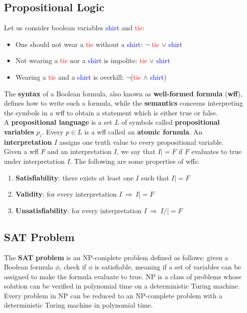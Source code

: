 \documentclass{article}
\begin{document}
\subsection{Propositional Logic}
Let us consider boolean variables \textcolor{blue}{shirt} and \textcolor{red}{tie}:
\begin{itemize}
    \item One should not wear a \textcolor{red}{tie} without a \textcolor{blue}{shirt}: $\neg$ \textcolor{red}{tie} $\lor$ \textcolor{blue}{shirt}
    \item Not wearing a \textcolor{red}{tie} nor a \textcolor{blue}{shirt} is impolite: \textcolor{red}{tie} $\lor$ \textcolor{blue}{shirt}
    \item Wearing a \textcolor{red}{tie} and a \textcolor{blue}{shirt} is overkill: $\neg$(\textcolor{red}{tie} $\land$ \textcolor{blue}{shirt})
\end{itemize}
The \textbf{syntax} of a Boolean formula, also known as \textbf{well-formed formula} (\textbf{wff}), defines how to write such a formula, while the \textbf{semantics} concerns interpreting the symbols in a wff to obtain a statement which is either true or false. \\
A \textbf{propositional language} is a set $L$ of symbols called \textbf{propositional variables} $p_i$. Every $p \in L$ is a wff called an \textbf{atomic formula}. An \textbf{interpretation} $I$ assigns one truth value to every propositional variable. \\
Given a wff $F$ and an interpretation $I$, we say that $I |= F$ if $F$ evaluates to true under interpretation $I$.
The following are some properties of wffs:
\begin{enumerate}
    \item \textbf{Satisfiability}: there exists at least one $I$ such that $I |= F$
    \item \textbf{Validity}: for every interpretation $I \ \Rightarrow \ I |= F$
    \item \textbf{Unsatisfiability}: for every interpretation $I \ \Rightarrow \ I /|= F$
\end{enumerate}
\subsection{SAT Problem}
The \textbf{SAT problem} is an NP-complete problem defined as follows: given a Boolean formula $\phi$, check if $\phi$ is satisfiable, meaning if a set of variables can be assigned to make the formula evaluate to true. NP is a class of problems whose solution can be verified in polynomial time on a deterministic Turing machine. Every problem in NP can be reduced to an NP-complete problem with a deterministic Turing machine in polynomial time.
\end{document}
